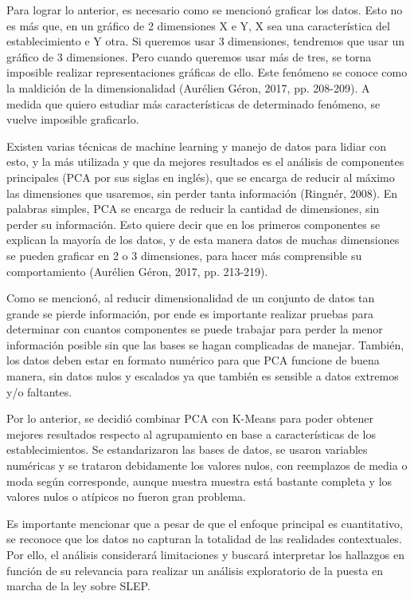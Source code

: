 \documentclass[
  12pt,
  letterpaper,
]{article}
\begin{document}
Para lograr lo anterior, es necesario como se mencionó graficar los datos.
Esto no es más que, en un gráfico de 2 dimensiones X e Y, X sea una característica del establecimiento e Y otra.
Si queremos usar 3 dimensiones, tendremos que usar un gráfico de 3 dimensiones.
Pero cuando queremos usar más de tres, se torna imposible realizar representaciones gráficas de ello.
Este fenómeno se conoce como la maldición de la dimensionalidad (Aurélien Géron, 2017, pp. 208-209).
A medida que quiero estudiar más características de determinado fenómeno, se vuelve imposible graficarlo.

Existen varias técnicas de machine learning y manejo de datos para lidiar con esto, y la más utilizada y que da mejores resultados es el análisis de componentes principales (PCA por sus siglas en inglés), que se encarga de reducir al máximo las dimensiones que usaremos, sin perder tanta información (Ringnér, 2008).
En palabras simples, PCA se encarga de reducir la cantidad de dimensiones, sin perder su información.
Esto quiere decir que en los primeros componentes se explican la mayoría de los datos, y de esta manera datos de muchas dimensiones se pueden graficar en 2 o 3 dimensiones, para hacer más comprensible su comportamiento (Aurélien Géron, 2017, pp. 213-219).

Como se mencionó, al reducir dimensionalidad de un conjunto de datos tan grande se pierde información, por ende es importante realizar pruebas para determinar con cuantos componentes se puede trabajar para perder la menor información posible sin que las bases se hagan complicadas de manejar.
También, los datos deben estar en formato numérico para que PCA funcione de buena manera, sin datos nulos y escalados ya que también es sensible a datos extremos y/o faltantes.

Por lo anterior, se decidió combinar PCA con K-Means para poder obtener mejores resultados respecto al agrupamiento en base a características de los establecimientos.
Se estandarizaron las bases de datos, se usaron variables numéricas y se trataron debidamente los valores nulos, con reemplazos de media o moda según corresponde, aunque nuestra muestra está bastante completa y los valores nulos o atípicos no fueron gran problema.

Es importante mencionar que a pesar de que el enfoque principal es cuantitativo, se reconoce que los datos no capturan la totalidad de las realidades contextuales.
Por ello, el análisis considerará limitaciones y buscará interpretar los hallazgos en función de su relevancia para realizar un análisis exploratorio de la puesta en marcha de la ley sobre SLEP.
\end{document}
